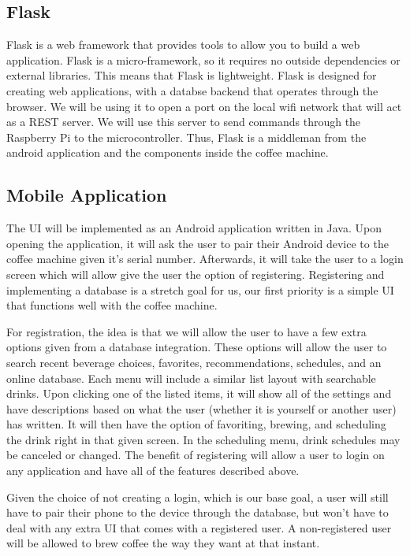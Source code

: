 \documentclass[conference]{IEEEtran}
\begin{document}
\subsection{Flask}
Flask is a web framework that provides tools to allow you to build a web application.
Flask is a micro-framework, so it requires no outside dependencies or external libraries.
This means that Flask is lightweight. Flask is designed for creating web applications,
with a databse backend that operates through the browser. We will be using it to open
a port on the local wifi network that will act as a REST server. We will use this server to send
commands through the Raspberry Pi to the microcontroller. Thus, Flask is a middleman from the 
android application and the components inside the coffee machine.

\subsection{Mobile Application}
The UI will be implemented as an Android application written in Java. Upon
opening the application, it will ask the user to pair their Android device to
the coffee machine given it's serial number. Afterwards, it will take the user
to a login screen which will allow give the user the option of registering.
Registering and implementing a database is a stretch goal for us, our first priority is a simple UI that functions well with the coffee machine. 

\par For registration, the idea is that we will allow the user to have a few extra options given from a database
integration. These options will allow the user to search recent beverage
choices, favorites, recommendations, schedules, and an online database. Each
menu will include a similar list layout with searchable drinks. Upon clicking
one of the listed items, it will show all of the settings and have descriptions
based on what the user (whether it is yourself or another user) has written. It
will then have the option of favoriting, brewing, and scheduling the drink
right in that given screen. In the scheduling menu, drink schedules may be
canceled or changed. The benefit of registering will allow a user to login on
any application and have all of the features described above.

\par Given the choice of not creating a login, which is our base goal, a user will still have to pair their
phone to the device through the database, but won't have to deal with any extra
UI that comes with a registered user. A non-registered user will be allowed to
brew coffee the way they want at that instant. 
\end{document}

